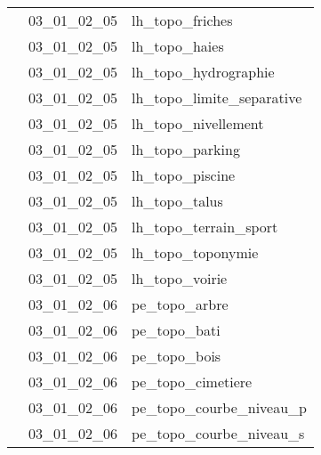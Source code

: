 \documentclass[12pt,titlepage]{book}
\begin{document}
\begin{supertabular}{|p{10cm}|c|p{15cm}|}
                    & 03\_01\_02\_05 & lh\_topo\_friches\\


                    & 03\_01\_02\_05 & lh\_topo\_haies\\


                    & 03\_01\_02\_05 & lh\_topo\_hydrographie\\


                    & 03\_01\_02\_05 & lh\_topo\_limite\_separative\\


                    & 03\_01\_02\_05 & lh\_topo\_nivellement\\


                    & 03\_01\_02\_05 & lh\_topo\_parking\\


                    & 03\_01\_02\_05 & lh\_topo\_piscine\\


                    & 03\_01\_02\_05 & lh\_topo\_talus\\


                    & 03\_01\_02\_05 & lh\_topo\_terrain\_sport\\


                    & 03\_01\_02\_05 & lh\_topo\_toponymie\\


                    & 03\_01\_02\_05 & lh\_topo\_voirie\\


                    & 03\_01\_02\_06 & pe\_topo\_arbre\\


                    & 03\_01\_02\_06 & pe\_topo\_bati\\


                    & 03\_01\_02\_06 & pe\_topo\_bois\\


                    & 03\_01\_02\_06 & pe\_topo\_cimetiere\\


                    & 03\_01\_02\_06 & pe\_topo\_courbe\_niveau\_p\\


                    & 03\_01\_02\_06 & pe\_topo\_courbe\_niveau\_s\\



\end{supertabular}
\end{document}
